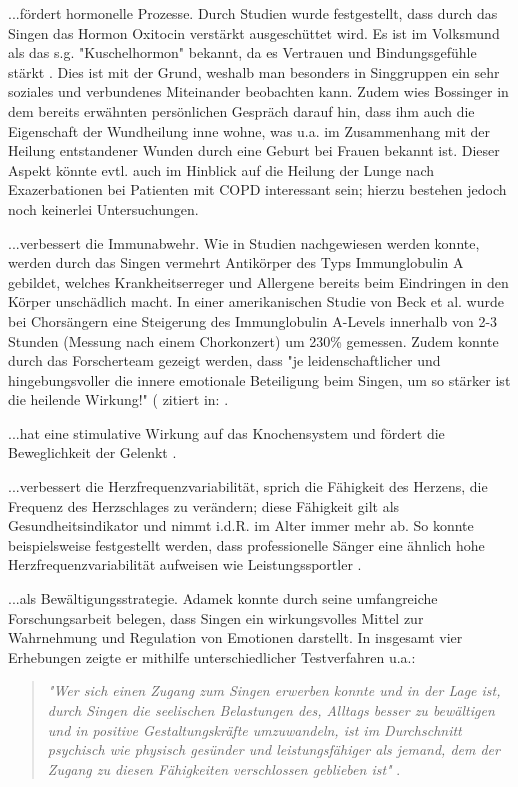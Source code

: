...fördert hormonelle Prozesse. Durch Studien wurde festgestellt, dass durch das Singen das Hormon Oxitocin verstärkt ausgeschüttet wird. 
Es ist im Volksmund als das s.g. "Kuschelhormon" bekannt, da es Vertrauen und Bindungsgefühle stärkt \autocite[vgl.]{geokompakt2013}. Dies ist mit der Grund, weshalb man besonders in Singgruppen ein sehr soziales und verbundenes Miteinander beobachten kann. Zudem wies Bossinger in dem bereits erwähnten persönlichen Gespräch darauf hin, dass ihm auch die Eigenschaft der Wundheilung inne wohne, was u.a. im Zusammenhang mit der Heilung entstandener Wunden durch eine Geburt bei Frauen bekannt ist. Dieser Aspekt könnte evtl. auch im Hinblick auf die Heilung der Lunge nach Exazerbationen bei Patienten mit COPD interessant sein; hierzu bestehen jedoch noch keinerlei Untersuchungen.

...verbessert die Immunabwehr. Wie in Studien nachgewiesen werden konnte, werden durch das Singen vermehrt Antikörper des Typs Immunglobulin A gebildet, welches Krankheitserreger und Allergene bereits beim Eindringen in den Körper unschädlich macht. In einer amerikanischen Studie von Beck et al. wurde bei Chorsängern eine Steigerung des Immunglobulin A-Levels innerhalb von 2-3 Stunden (Messung nach einem Chorkonzert) um 230\% gemessen. Zudem konnte durch das Forscherteam gezeigt werden, dass "je leidenschaftlicher und hingebungsvoller die innere emotionale Beteiligung beim Singen, um so stärker ist die heilende Wirkung!" (\citep{fisher2001} zitiert in: \cite[157]{bossinger2006}.

...hat eine stimulative Wirkung auf das Knochensystem und fördert die Beweglichkeit der Gelenkt \autocite[vgl.][201]{cramer1998}.

...verbessert die Herzfrequenzvariabilität, sprich die Fähigkeit des Herzens, die Frequenz des Herzschlages zu verändern; diese Fähigkeit gilt als Gesundheitsindikator und nimmt i.d.R. im Alter immer mehr ab. So konnte beispielsweise festgestellt werden, dass professionelle Sänger eine ähnlich hohe Herzfrequenzvariabilität aufweisen wie Leistungssportler \autocite[vgl.]{bossinger2014}. 

...als Bewältigungsstrategie. Adamek konnte durch seine umfangreiche Forschungsarbeit belegen, dass Singen ein wirkungsvolles Mittel zur Wahrnehmung und Regulation von Emotionen darstellt. In insgesamt vier Erhebungen zeigte er mithilfe unterschiedlicher Testverfahren u.a.:

\begin{quote}
\emph{"Wer sich einen Zugang zum Singen erwerben konnte und in der Lage ist, durch Singen die seelischen Belastungen des, Alltags besser zu bewältigen und in positive Gestaltungskräfte umzuwandeln, ist im Durchschnitt psychisch wie physisch gesünder und leistungsfähiger als jemand, dem der Zugang zu diesen Fähigkeiten verschlossen geblieben ist"} \autocite[93ff.]{adamek1997}. 
\end{quote}

